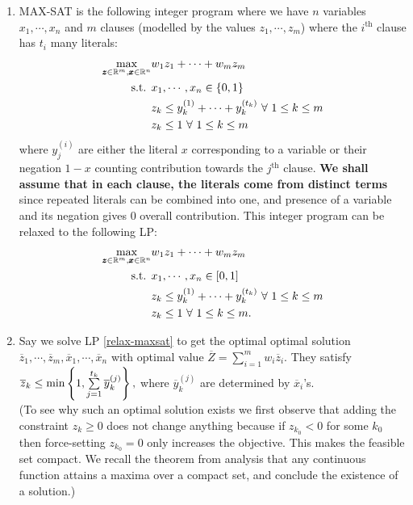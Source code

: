 \soln


\begin{enumerate}[label=(\alph*)]
\item 
MAX-SAT is the following integer program where we have $n$ variables $x_{1},\cdots,x_{n}$ and $m$ clauses (modelled by the values $z_{1},\cdots,z_{m}$) where the $i^{\text{th}}$ clause has $t_{i}$ many literals:
\begin{equation}\begin{aligned}
\max_{\pmb z\in\mathbb{R}^{m}, \pmb x\in \mathbb{R}^{n}} & w_{1}z_{1} + \cdots +w_{m}z_{m}\\
\text{s.t. } & x_{1},\cdots,x_{n} \in \left\{0,1\right\}\\
& z_{k}\le y_{k}^{(1)} + \cdots + y_{k}^{(t_{k})} ~\forall~1\le k\le m\\
& z_{k} \le 1 ~\forall~ 1\le k\le m
\end{aligned}\end{equation}
where $y_{j}^{(i)}$ are either the literal $x$ corresponding to a variable or their negation $1-x$ counting contribution towards the $j^{\text{th}}$ clause. \textbf{We shall assume that in each clause, the literals come from distinct terms} since repeated literals can be combined into one, and presence of a variable and its negation gives $0$ overall contribution. This integer program can be relaxed to the following LP:
\begin{equation}\label{relax-maxsat}\begin{aligned}
\max_{\pmb z\in\mathbb{R}^{m}, \pmb x\in \mathbb{R}^{n}} & w_{1}z_{1} + \cdots +w_{m}z_{m}\\
\text{s.t. } & x_{1},\cdots,x_{n} \in [0,1]\\
& z_{k}\le y_{k}^{(1)} + \cdots + y_{k}^{(t_{k})} ~\forall~1\le k\le m\\
& z_{k} \le 1 ~\forall~ 1\le k\le m.
\end{aligned}\end{equation}
\item Say we solve LP \ref{relax-maxsat} to get the optimal  optimal solution $\overline{z}_{1}, \cdots, \overline{z}_{m}, \overline{x}_{1}, \cdots, \overline{x}_{n}$ with optimal value $\overline Z = \sum\limits_{i=1}^{m}w_{i}\overline z_{i}$. They satisfy $\overline z_{k} \le \min\left\{1,\sum\limits_{j=1}^{t_{k}}\overline y_{k}^{(j)}\right\},$ where $\overline y_{k}^{(j)}$ are determined by $\overline x_{i}$'s. \\
(To see why such an optimal solution exists we first observe that adding the constraint $z_{k}\ge 0$ does not change anything because if $z_{k_{0}}<0$ for some $k_{0}$ then force-setting $z_{k_{0}}=0$ only increases the objective. This makes the feasible set compact. We recall the theorem from analysis that any continuous function attains a maxima over a compact set, and conclude the existence of a solution.)


\end{enumerate}
